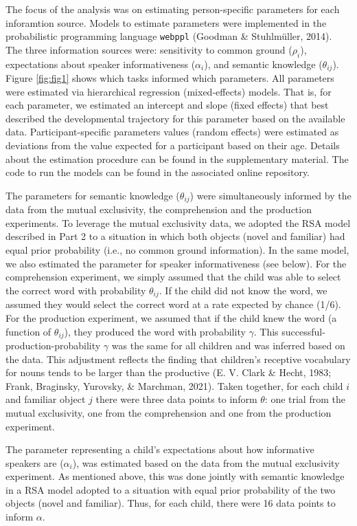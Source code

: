 \documentclass[
  man,floatsintext]{apa6}
\begin{document}
The focus of the analysis was on estimating person-specific parameters for each inforamtion source. Models to estimate parameters were implemented in the probabilistic programming language \texttt{webppl} (Goodman \& Stuhlmüller, 2014). The three information sources were: sensitivity to common ground (\(\rho_i\)), expectations about speaker informativeness (\(\alpha_i\)), and semantic knowledge (\(\theta_{ij}\)). Figure \ref{fig:fig1} shows which tasks informed which parameters. All parameters were estimated via hierarchical regression (mixed-effects) models. That is, for each parameter, we estimated an intercept and slope (fixed effects) that best described the developmental trajectory for this parameter based on the available data. Participant-specific parameters values (random effects) were estimated as deviations from the value expected for a participant based on their age. Details about the estimation procedure can be found in the supplementary material. The code to run the models can be found in the associated online repository.

The parameters for semantic knowledge (\(\theta_{ij}\)) were simultaneously informed by the data from the mutual exclusivity, the comprehension and the production experiments. To leverage the mutual exclusivity data, we adopted the RSA model described in Part 2 to a situation in which both objects (novel and familiar) had equal prior probability (i.e., no common ground information). In the same model, we also estimated the parameter for speaker informativeness (see below). For the comprehension experiment, we simply assumed that the child was able to select the correct word with probability \(\theta_{ij}\). If the child did not know the word, we assumed they would select the correct word at a rate expected by chance (1/6). For the production experiment, we assumed that if the child knew the word (a function of \(\theta_{ij}\)), they produced the word with probability \(\gamma\). This successful-production-probability \(\gamma\) was the same for all children and was inferred based on the data. This adjustment reflects the finding that children's receptive vocabulary for nouns tends to be larger than the productive (E. V. Clark \& Hecht, 1983; Frank, Braginsky, Yurovsky, \& Marchman, 2021). Taken together, for each child \(i\) and familiar object \(j\) there were three data points to inform \(\theta\): one trial from the mutual exclusivity, one from the comprehension and one from the production experiment.

The parameter representing a child's expectations about how informative speakers are (\(\alpha_i\)), was estimated based on the data from the mutual exclusivity experiment. As mentioned above, this was done jointly with semantic knowledge in a RSA model adopted to a situation with equal prior probability of the two objects (novel and familiar). Thus, for each child, there were 16 data points to inform \(\alpha\).
\end{document}
